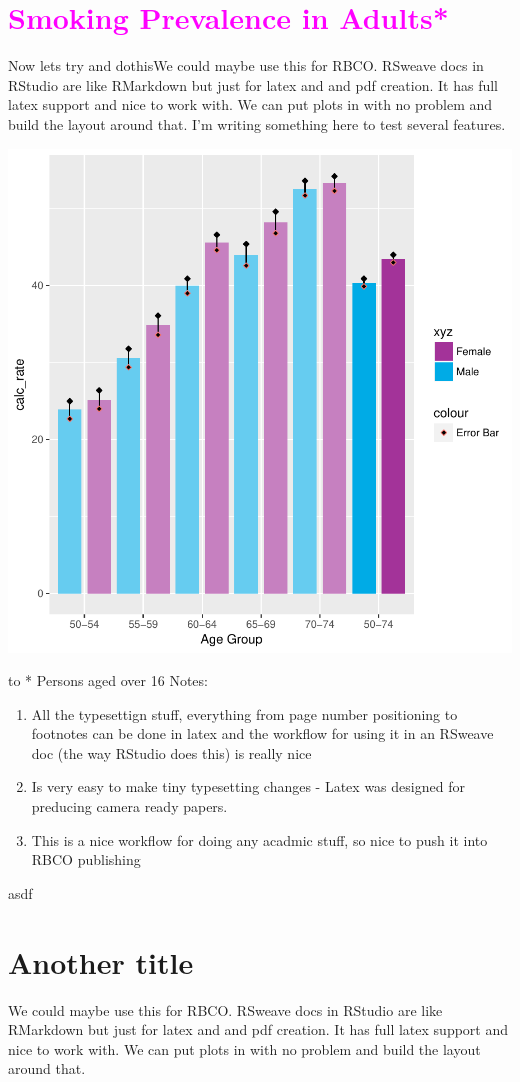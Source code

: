 \documentclass{article}
\begin{document}




\section*{\textcolor{Fuchsia}{Smoking Prevalence in Adults*}}

Now lets try and dothisWe could maybe use this for RBCO. RSweave docs in RStudio are like RMarkdown but just for latex and and pdf creation. It has full latex support and nice to work with. We can put plots in with no problem and build the layout around that.
I'm writing something here to test
several features.
\break
\break

\includegraphics{pdfCreator-002}


\def\dashfill{\cleaders\hbox{-}\hfill}
\hbox to \hsize{\dashfill\hfil}
\bye
* Persons aged over 16 \newline
Notes: 

\begin{enumerate}
  \item All the typesettign stuff, everything from page number positioning to footnotes can be done in latex and the workflow for using it in an RSweave doc (the way RStudio does this) is really nice
  \item Is very easy to make tiny typesetting changes - Latex was designed for preducing camera ready papers. 
  \item This is a nice workflow for doing any acadmic stuff, so nice to push it into RBCO publishing
   
\end{enumerate}

\break
asdf
\break


\section*{Another title}

We could maybe use this for RBCO. RSweave docs in RStudio are like RMarkdown but just for latex and and pdf creation. It has full latex support and nice to work with. We can put plots in with no problem and build the layout around that.
\end{document}
